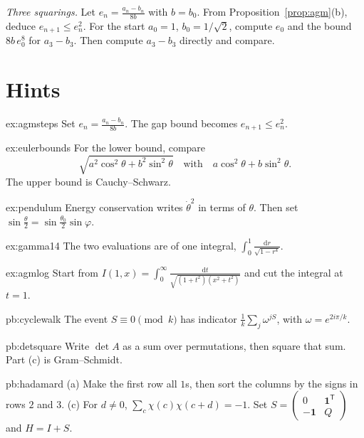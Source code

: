 \begin{exercise}[$\star\star\star$]\label{ex:rw13c}
\emph{Three squarings.} Let $e_n=\frac{a_n-b_n}{8b}$ with $b=b_0$. From Proposition~\ref{prop:agm}(b), deduce $e_{n+1}\le e_n^2$. For the start $a_0=1$, $b_0=1/\sqrt2$, compute $e_0$ and the bound $8b\,e_0^{8}$ for $a_3-b_3$. Then compute $a_3-b_3$ directly and compare.
\end{exercise}

\section{Hints}

\begin{hint}{ex:agmsteps}
Set $e_n=\frac{a_n-b_n}{8b}$. The gap bound becomes $e_{n+1}\le e_n^2$.
\end{hint}
\begin{hint}{ex:eulerbounds}
For the lower bound, compare
\[
\sqrt{a^2\cos^2\theta+b^2\sin^2\theta}
\quad\text{with}\quad a\cos^2\theta+b\sin^2\theta.
\]
The upper bound is Cauchy--Schwarz.
\end{hint}
\begin{hint}{ex:pendulum}
Energy conservation writes $\dot\theta^2$ in terms of $\theta$. Then set $\sin\frac\theta2=\sin\frac{\theta_0}2\sin\varphi$.
\end{hint}
\begin{hint}{ex:gamma14}
The two evaluations are of one integral, $\int_0^1\frac{\mathrm dr}{\sqrt{1-r^4}}$.
\end{hint}
\begin{hint}{ex:agmlog}
Start from $I(1,x)=\int_0^\infty\frac{\mathrm dt}{\sqrt{(1+t^2)(x^2+t^2)}}$ and cut the integral at $t=1$.
\end{hint}

\begin{hint}{pb:cyclewalk}
The event $S\equiv0\pmod k$ has indicator $\frac1k\sum_j\omega^{jS}$, with $\omega=e^{2i\pi/k}$.
\end{hint}

\begin{hint}{pb:detsquare}
Write $\det A$ as a sum over permutations, then square that sum. Part (c) is Gram--Schmidt.
\end{hint}

\begin{hint}{pb:hadamard}
(a) Make the first row all $1$s, then sort the columns by the signs in rows $2$ and $3$. (c) For $d\ne0$,
$\sum_c\chi(c)\chi(c+d)=-1$. Set $S=\begin{pmatrix}0&\mathbf1^{\mathsf T}\\-\mathbf1&Q\end{pmatrix}$ and $H=I+S$.
\end{hint}

